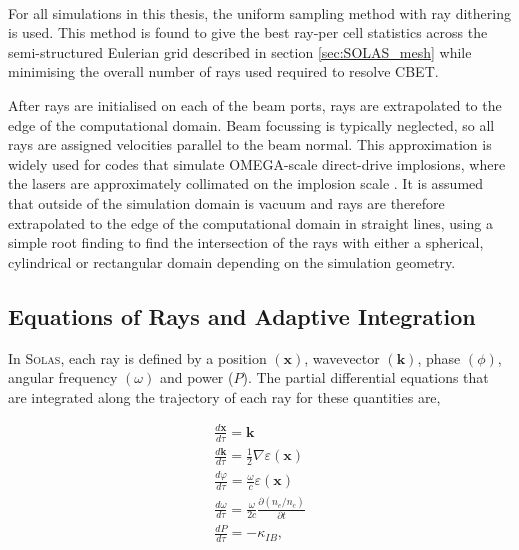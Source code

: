 \paragraph*{}
For all simulations in this thesis, the uniform sampling method with ray dithering is used.
This method is found to give the best ray-per cell statistics across the semi-structured Eulerian grid described in section \ref{sec:SOLAS_mesh} while minimising the overall number of rays used required to resolve \ac{CBET}.

After rays are initialised on each of the beam ports, rays are extrapolated to the edge of the computational domain.
Beam focussing is typically neglected, so all rays are assigned velocities parallel to the beam normal.
This approximation is widely used for codes that simulate OMEGA-scale direct-drive implosions, where the lasers are approximately collimated on the implosion scale \cite{colaitis_inverse_2021,marozas_wavelength-detuning_2018}.
It is assumed that outside of the simulation domain is vacuum and rays are therefore extrapolated to the edge of the computational domain in straight lines, using a simple root finding to find the intersection of the rays with either a spherical, cylindrical or rectangular domain depending on the simulation geometry.

\subsection{Equations of Rays and Adaptive Integration}
\label{sec:SOLAS_ray_propagation}

In \textsc{Solas}, each ray is defined by a position $(\mathbf{x})$, wavevector $(\mathbf{k})$, phase $(\phi)$, angular frequency $(\omega)$ and power ($P$).
The partial differential equations that are integrated along the trajectory of each ray for these quantities are,

\begin{equation}
    \label{eq:SOLAS_rays}
    \begin{gathered}
        \frac{d \mathbf{x}}{d \tau}=\mathbf{k} \\
        \frac{d \mathbf{k}}{d \tau}=\frac{1}{2} \nabla \varepsilon(\mathbf{x}) \\
        \frac{d \varphi}{d \tau}=\frac{\omega}{c} \varepsilon(\mathbf{x}) \\
        \frac{d \omega}{d \tau}=\frac{\omega}{2 c} \frac{\partial\left(n_e / n_c\right)}{\partial t} \\
        \frac{d P}{d \tau}=-\kappa_{IB},
    \end{gathered}
\end{equation}

